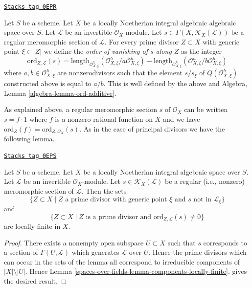 \begin{definition}
\label{spaces-over-fields-definition-order-vanishing-meromorphic}
\href{https://stacks.math.columbia.edu/tag/0EPR}{\texttt{Stacks tag 0EPR}}

Let $S$ be a scheme. Let $X$ be a locally Noetherian integral
algebraic algebraic space over $S$. Let $\mathcal{L}$ be an
invertible $\mathcal{O}_X$-module.
Let $s \in \Gamma(X, \mathcal{K}_X(\mathcal{L}))$
be a regular meromorphic section of $\mathcal{L}$.
For every prime divisor $Z \subset X$ with generic point $\xi \in |Z|$
we define the
{\it order of vanishing of $s$ along $Z$}
as the integer
$$
\text{ord}_{Z, \mathcal{L}}(s) =
\text{length}_{\mathcal{O}_{X, \xi}^h}
(\mathcal{O}_{X, \xi}^h/a \mathcal{O}_{X, \xi}^h) -
\text{length}_{\mathcal{O}_{X, \xi}^h}
(\mathcal{O}_{X, \xi}^h/b \mathcal{O}_{X, \xi}^h)
$$
where $a, b \in \mathcal{O}_{X, \xi}^h$ are nonzerodivisors
such that the element $s/s_\xi$ of $Q(\mathcal{O}_{X, \xi}^h)$
constructed above is equal to $a/b$.
This is well defined by the above and
Algebra, Lemma \ref{algebra-lemma-ord-additive}.
\end{definition}

As explained above, a regular meromorphic section $s$ of $\mathcal{O}_X$
can be written $s = f \cdot 1$ where $f$
is a nonzero rational function on $X$ and we have
$\text{ord}_Z(f) = \text{ord}_{Z, \mathcal{O}_X}(s)$.
As in the case of principal divisors we have the following lemma.

\begin{lemma}
\label{spaces-over-fields-lemma-divisor-meromorphic-locally-finite}
\href{https://stacks.math.columbia.edu/tag/0EPS}{\texttt{Stacks tag 0EPS}}

Let $S$ be a scheme. Let $X$ be a locally Noetherian integral algebraic space
over $S$. Let $\mathcal{L}$ be an invertible $\mathcal{O}_X$-module.
Let $s \in \mathcal{K}_X(\mathcal{L})$ be a
regular (i.e., nonzero) meromorphic section of $\mathcal{L}$. Then the sets
$$
\{Z \subset X \mid Z \text{ a prime divisor with generic point }\xi
\text{ and }s\text{ not in }\mathcal{L}_\xi\}
$$
and
$$
\{Z \subset X \mid Z \text{ is a prime divisor and }
\text{ord}_{Z, \mathcal{L}}(s) \not = 0\}
$$
are locally finite in $X$.
\end{lemma}

\begin{proof}
There exists a nonempty open subspace $U \subset X$ such that $s$
corresponds to a section of $\Gamma(U, \mathcal{L})$ which generates
$\mathcal{L}$ over $U$. Hence the prime divisors which can occur
in the sets of the lemma all correspond to irreducible components of
$|X| \setminus |U|$. Hence Lemma \ref{spaces-over-fields-lemma-components-locally-finite}.
gives the desired result.
\end{proof}

